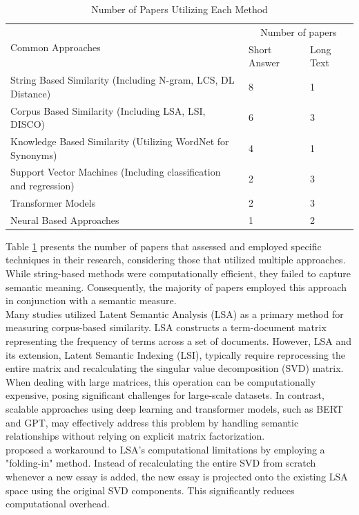\documentclass{article}
\begin{document}
	\begin{table}[H]
		\begin{tabularx}{7in}{|X|m{0.8in}|m{0.8in}|}
			\hline
			\multirow{2}{*}{Common Approaches} & \multicolumn{2}{c|}{Number of papers} \\ \cline{2-3}
			& Short Answer & Long Text \\ \hline
			String Based Similarity (Including N-gram, LCS, DL Distance) & 8 & 1 \\
			Corpus Based Similarity (Including LSA, LSI, DISCO) & 6 & 3 \\
			Knowledge Based Similarity (Utilizing WordNet for Synonyms) & 4 & 1 \\
			Support Vector Machines (Including classification and regression) & 2 & 3 \\
			Transformer Models & 2 & 3 \\
			Neural Based Approaches & 1 & 2 \\ 
			\hline
		\end{tabularx}
		\caption{Number of Papers Utilizing Each Method}
		\label{tab::papertypes}
	\end{table}
	Table \ref{tab::papertypes} presents the number of papers that assessed and employed specific techniques in their research, considering those that utilized multiple approaches. While string-based methods were computationally efficient, they failed to capture semantic meaning. Consequently, the majority of papers employed this approach in conjunction with a semantic measure. \\
	
	Many studies utilized Latent Semantic Analysis (LSA) as a primary method for measuring corpus-based similarity. LSA constructs a term-document matrix representing the frequency of terms across a set of documents. However, LSA and its extension, Latent Semantic Indexing (LSI), typically require reprocessing the entire matrix and recalculating the singular value decomposition (SVD) matrix. When dealing with large matrices, this operation can be computationally expensive, posing significant challenges for large-scale datasets. In contrast, scalable approaches using deep learning and transformer models, such as BERT and GPT, may effectively address this problem by handling semantic relationships without relying on explicit matrix factorization. \\
	
	\textcite{17_abbas2015svm} proposed a workaround to LSA’s computational limitations by employing a "folding-in" method. Instead of recalculating the entire SVD from scratch whenever a new essay is added, the new essay is projected onto the existing LSA space using the original SVD components. This significantly reduces computational overhead. \\
	
\end{document}
